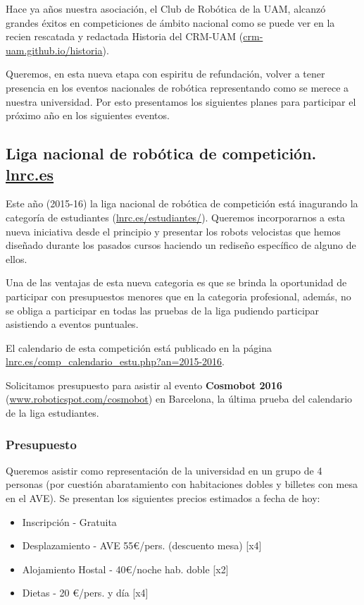 \documentclass[12pt,twoside]{report}
\begin{document}
Hace ya años nuestra asociación, el Club de Robótica de la UAM, alcanzó grandes éxitos en competiciones de ámbito nacional como se puede ver en la recien rescatada y redactada Historia del CRM-UAM (\url{crm-uam.github.io/historia}).

Queremos, en esta nueva etapa con espiritu de refundación, volver a tener presencia en los eventos nacionales de robótica representando como se merece a nuestra universidad. Por esto presentamos los siguientes planes para participar el próximo año en los siguientes eventos.

\subsection{Liga nacional de robótica de competición. \url{lnrc.es}}
Este año (2015-16) la liga nacional de robótica de competición está inagurando la categoría de estudiantes (\url{lnrc.es/estudiantes/}). Queremos incorporarnos a esta nueva iniciativa desde el principio y presentar los robots velocistas que hemos diseñado durante los pasados cursos haciendo un rediseño específico de alguno de ellos.

Una de las ventajas de esta nueva categoria es que se brinda la oportunidad de participar con presupuestos menores que en la categoria profesional, además, no se obliga a participar en todas las pruebas de la liga pudiendo participar asistiendo a eventos puntuales.

El calendario de esta competición está publicado en la página \url{lnrc.es/comp_calendario_estu.php?an=2015-2016}.

Solicitamos presupuesto para asistir al evento {\bf Cosmobot 2016} (\url{www.roboticspot.com/cosmobot}) en Barcelona, la última prueba del calendario de la liga estudiantes.

\subsubsection{Presupuesto}
Queremos asistir como representación de la universidad en un grupo de 4 personas (por cuestión abaratamiento con habitaciones dobles y billetes con mesa en el AVE). Se presentan los siguientes precios estimados a fecha de hoy:
\begin{itemize}
\item Inscripción - Gratuita
\item Desplazamiento - AVE 55\euro{}/pers. (descuento mesa) [x4]
\item Alojamiento Hostal - 40\euro{}/noche hab. doble [x2]
\item Dietas - 20 \euro{}/pers. y día [x4]
\end{itemize}
\end{document}
